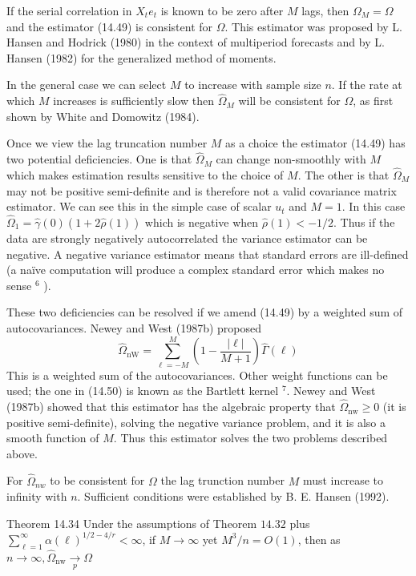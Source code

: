 \documentclass[10pt]{article}
\begin{document}
If the serial correlation in $X_{t} e_{t}$ is known to be zero after $M$ lags, then $\Omega_{M}=\Omega$ and the estimator (14.49) is consistent for $\Omega$. This estimator was proposed by L. Hansen and Hodrick (1980) in the context of multiperiod forecasts and by L. Hansen (1982) for the generalized method of moments.

In the general case we can select $M$ to increase with sample size $n$. If the rate at which $M$ increases is sufficiently slow then $\widehat{\Omega}_{M}$ will be consistent for $\Omega$, as first shown by White and Domowitz (1984).

Once we view the lag truncation number $M$ as a choice the estimator (14.49) has two potential deficiencies. One is that $\widehat{\Omega}_{M}$ can change non-smoothly with $M$ which makes estimation results sensitive to the choice of $M$. The other is that $\widehat{\Omega}_{M}$ may not be positive semi-definite and is therefore not a valid covariance matrix estimator. We can see this in the simple case of scalar $u_{t}$ and $M=1$. In this case $\widehat{\Omega}_{1}=\widehat{\gamma}(0)(1+2 \widehat{\rho}(1))$ which is negative when $\widehat{\rho}(1)<-1 / 2$. Thus if the data are strongly negatively autocorrelated the variance estimator can be negative. A negative variance estimator means that standard errors are ill-defined (a naïve computation will produce a complex standard error which makes no sense ${ }^{6}$ ).

These two deficiencies can be resolved if we amend (14.49) by a weighted sum of autocovariances. Newey and West (1987b) proposed
$$
\widehat{\Omega}_{\mathrm{nW}}=\sum_{\ell=-M}^{M}\left(1-\frac{|\ell|}{M+1}\right) \widehat{\Gamma}(\ell)
$$
This is a weighted sum of the autocovariances. Other weight functions can be used; the one in (14.50) is known as the Bartlett kernel ${ }^{7}$. Newey and West (1987b) showed that this estimator has the algebraic property that $\widehat{\Omega}_{\mathrm{nw}} \geq 0$ (it is positive semi-definite), solving the negative variance problem, and it is also a smooth function of $M$. Thus this estimator solves the two problems described above.

For $\widehat{\Omega}_{n w}$ to be consistent for $\Omega$ the lag trunction number $M$ must increase to infinity with $n$. Sufficient conditions were established by B. E. Hansen (1992).

Theorem 14.34 Under the assumptions of Theorem $14.32$ plus $\sum_{\ell=1}^{\infty} \alpha(\ell)^{1 / 2-4 / r}<\infty$, if $M \rightarrow \infty$ yet $M^{3} / n=O(1)$, then as $n \rightarrow \infty, \widehat{\Omega}_{\mathrm{nw}} \underset{p}{\rightarrow} \Omega$
\end{document}
